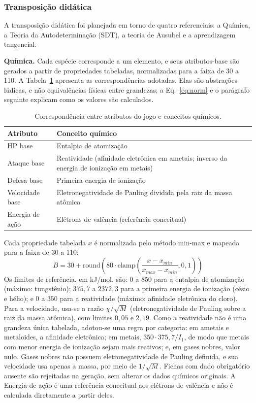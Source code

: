 \subsubsection{Transposição didática}
A transposição didática foi planejada em torno de quatro referenciais: a Química, a Teoria da Autodeterminação (SDT), a teoria de Ausubel e a aprendizagem tangencial.

\textbf{Química.} Cada espécie corresponde a um elemento, e seus atributos-base são gerados a partir de propriedades tabeladas, normalizadas para a faixa de 30 a 110. A Tabela~\ref{tab:quimica} apresenta as correspondências adotadas. Elas são abstrações lúdicas, e não equivalências físicas entre grandezas; a Eq.~\ref{eq:norm} e o parágrafo seguinte explicam como os valores são calculados.

\begin{table}[!h]
\caption{Correspondência entre atributos do jogo e conceitos químicos.}
\label{tab:quimica}
\centering
\footnotesize
\begin{tabular}{@{}p{1.7cm}p{5.9cm}@{}}
\hline
\textbf{Atributo} & \textbf{Conceito químico} \\
\hline
HP base & Entalpia de atomização \\
Ataque base & Reatividade (afinidade eletrônica em ametais; inverso da energia de ionização em metais) \\
Defesa base & Primeira energia de ionização \\
Velocidade base & Eletronegatividade de Pauling dividida pela raiz da massa atômica \\
Energia de ação & Elétrons de valência (referência conceitual) \\
\hline
\end{tabular}
\end{table}

Cada propriedade tabelada $x$ é normalizada pelo método min-max e mapeada para a faixa de 30 a 110:
\begin{equation}
B=30+\mathrm{round}\!\left(80\cdot\mathrm{clamp}\!\left(\frac{x-x_{min}}{x_{max}-x_{min}},0,1\right)\right)
\label{eq:norm}
\end{equation}
Os limites de referência, em kJ/mol, são: $0$ a $850$ para a entalpia de atomização (máximo: tungstênio); $375{,}7$ a $2372{,}3$ para a primeira energia de ionização (césio e hélio); e $0$ a $350$ para a reatividade (máximo: afinidade eletrônica do cloro). Para a velocidade, usa-se a razão $\chi/\sqrt{M}$ (eletronegatividade de Pauling sobre a raiz da massa atômica), com limites $0{,}05$ e $2{,}19$. Como a reatividade não é uma grandeza única tabelada, adotou-se uma regra por categoria: em ametais e metaloides, a afinidade eletrônica; em metais, $350\cdot 375{,}7/I_1$, de modo que metais com menor energia de ionização sejam mais reativos; e, em gases nobres, valor nulo. Gases nobres não possuem eletronegatividade de Pauling definida, e sua velocidade usa apenas a massa, por meio de $1/\sqrt{M}$. Fichas com dado obrigatório ausente são rejeitadas na geração, sem alterar os dados químicos originais. A Energia de ação é uma referência conceitual aos elétrons de valência e não é calculada diretamente a partir deles.

